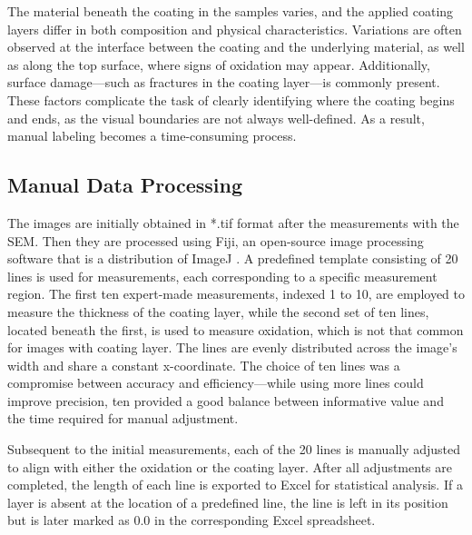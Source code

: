 The material beneath the coating in the samples varies, and the applied coating layers differ in both composition and physical characteristics. Variations are often observed at the interface between the coating and the underlying material, as well as along the top surface, where signs of oxidation may appear. Additionally, surface damage—such as fractures in the coating layer—is commonly present. These factors complicate the task of clearly identifying where the coating begins and ends, as the visual boundaries are not always well-defined. As a result, manual labeling becomes a time-consuming process.


\subsection{Manual Data Processing}\label{sec:ManualProc}

The images are initially obtained in *.tif format after the measurements with the SEM. Then they are processed using Fiji, an open-source image processing software that is a distribution of ImageJ \cite{Schindelin2012}. A predefined template consisting of 20 lines is used for measurements, each corresponding to a specific measurement region. The first ten expert-made measurements, indexed 1 to 10, are employed to measure the thickness of the coating layer, while the second set of ten lines, located beneath the first, is used to measure oxidation, which is not that common for images with coating layer. The lines are evenly distributed across the image's width and share a constant x-coordinate. The choice of ten lines was a compromise between accuracy and efficiency—while using more lines could improve precision, ten provided a good balance between informative value and the time required for manual adjustment.

Subsequent to the initial measurements, each of the 20 lines is manually adjusted to align with either the oxidation or the coating layer. After all adjustments are completed, the length of each line is exported to Excel for statistical analysis. If a layer is absent at the location of a predefined line, the line is left in its position but is later marked as 0.0 in the corresponding Excel spreadsheet.



